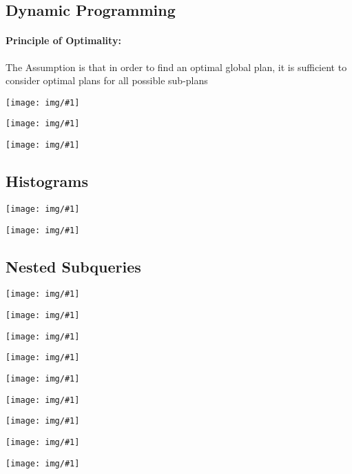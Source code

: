 \documentclass[a4paper]{article}
\newcommand{\img}[1]{\begin{center}
    \texttt{[image: img/\#1]}
\end{center} }
\begin{document}
\begin{twocolumn}
\subsection{Dynamic Programming}
\paragraph{Principle of Optimality:} The Assumption is that in order to find an optimal global plan, it is sufficient to consider optimal plans for all possible sub-plans \\
\img{dynamic_prog}
\img{dynamic_prog_algo}
\img{greedy_join_enum}

\subsection{Histograms}
\img{cardinality_hist_width}
\img{cardinality_hist_depth}

\subsection{Nested Subqueries}
\img{nested_sub_types}
\img{nested_sub_nj}
\img{nested_sub_ja}
\img{nested_sub_ja_0}
\img{nested_sub_ja_1}
\img{nested_sub_ja2}

\img{nested_sub_ex}
\img{nested_sub_any}
\img{nested_sub_algo}

\end{twocolumn}
\end{document}
